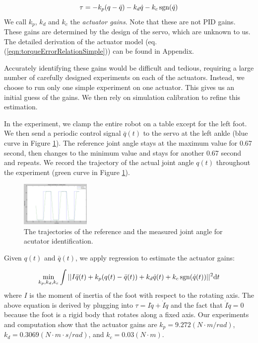 \begin{equation}
  \tau = -k_p(q-\bar{q}) - k_d\dot{q} - k_c\operatorname{sgn}(\dot{q})\\
    \label{eqn:torqueErrorRelationSimple}
\end{equation}
We call $k_p$, $k_d$ and $k_c$ the \emph{actuator gains}. Note that these are not PID gains. These gains are determined by the design of the servo, which are unknown to us. The detailed derivation of the actuator model (eq. (\ref{eqn:torqueErrorRelationSimple})) can be found in Appendix.

Accurately identifying these gains would be difficult and tedious, requiring a large number of carefully designed experiments on each of the actuators. Instead, we choose to run only one simple experiment on one actuator. This gives us an initial guess of the gains. We then rely on simulation calibration to refine this estimation.

In the experiment, we clamp the entire robot on a table except for the left foot. We then send a periodic control signal $\bar{q}(t)$ to the servo at the left ankle (blue curve in Figure \ref{fig:actuatorId}). The reference joint angle stays at the maximum value for 0.67 second, then changes to the minimum value and stays for another 0.67 second and repeats. We record the trajectory of the actual joint angle $q(t)$ throughout the experiment (green curve in Figure \ref{fig:actuatorId}). 

\begin{figure}[!t]
  \centering
  \includegraphics[width=0.3\textwidth]{figures/actuatorId}
  \caption{The trajectories of the reference and the measured joint angle for acutator identification.}
  \vspace{-0.1in}
  \label{fig:actuatorId}
\end{figure}

Given $q(t)$ and $\bar{q}(t)$, we apply regression to estimate the actuator gains:

\begin{displaymath}
\min_{k_p, k_d, k_c}\int||I\ddot{q}(t)+k_p(q(t)-\bar{q}(t)) + k_d\dot{q}(t) + k_c\operatorname{sgn}(\dot{q}(t))||^2\mathrm{d}t
\end{displaymath}
where $I$ is the moment of inertia of the foot with respect to the rotating axis. The above equation is derived by plugging into $\tau = I\ddot{q}+\dot{I}\dot{q}$ and the fact that $\dot{I}\dot{q}=0$ because the foot is a rigid body that rotates along a fixed axis. Our experiments and computation show that the actuator gains are $k_p=9.272(N\cdot m/rad)$, $k_d=0.3069(N\cdot m\cdot s/rad)$, and $k_c=0.03(N\cdot m)$. 



